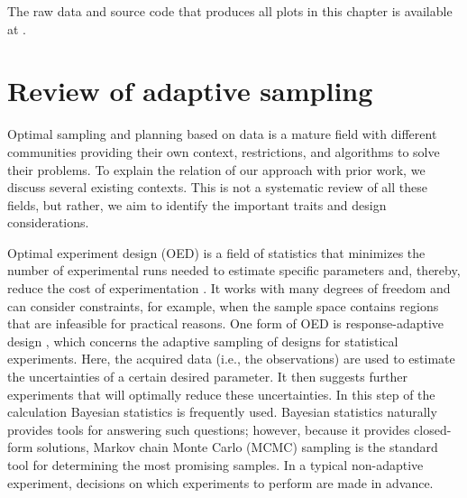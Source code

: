 The raw data and source code that produces all plots in this chapter is available at \cite{papercode}.

\hypertarget{sec:review}{%
\section{Review of adaptive sampling}\label{sec:review}}

Optimal sampling and planning based on data is a mature field with different communities providing their own context, restrictions, and algorithms to solve their problems.
To explain the relation of our approach with prior work, we discuss several existing contexts.
This is not a systematic review of all these fields, but rather, we aim to identify the important traits and design considerations.


Optimal experiment design (OED) is a field of statistics that minimizes the number of experimental runs needed to estimate specific parameters and, thereby, reduce the cost of experimentation \cite{Emery1998}.
It works with many degrees of freedom and can consider constraints, for example, when the sample space contains regions that are infeasible for practical reasons.
One form of OED is response-adaptive design \cite{Hu2006}, which concerns the adaptive sampling of designs for statistical experiments.
Here, the acquired data (i.e., the observations) are used to estimate the uncertainties of a certain desired parameter.
It then suggests further experiments that will optimally reduce these uncertainties.
In this step of the calculation Bayesian statistics is frequently used.
Bayesian statistics naturally provides tools for answering such questions; however, because it provides closed-form solutions, Markov chain Monte Carlo (MCMC) sampling is the standard tool for determining the most promising samples.
In a typical non-adaptive experiment, decisions on which experiments to perform are made in advance.


